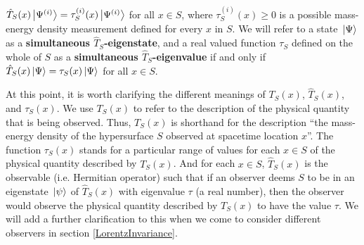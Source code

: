   $\hat{T}_S(x)\ket{\Psi^{(i)}}=\tau^{(i)}_S(x)\ket{\Psi^{(i)}}$ for all $x\in S$, where $\tau^{(i)}_S(x)\geq 0$ is a possible mass-energy density measurement defined for every $x$ in $S$. We will refer to a state $\ket*{\Psi}$ as a \textbf{simultaneous $\hat{T}_S$-eigenstate}, and a real valued function $\tau_S$ defined on the whole of $S$ as a  \textbf{simultaneous $\hat{T}_S$-eigenvalue} if and only if $\hat{T}_S(x)\ket*{\Psi}=\tau_S(x)\ket*{\Psi}$ for all $x\in S$.\label{simultaneous}

 At this point, it is worth clarifying the different meanings of $T_S(x)$, $\hat{T}_S(x)$, and $\tau_S(x)$.\label{TSclarification} We use $T_S(x)$ to refer to the description of the physical quantity that is being observed. Thus, $T_S(x)$ is shorthand for the description ``the mass-energy density of the hypersurface $S$ observed at spacetime location $x$''. The function $\tau_S(x)$ stands for a particular range of values for each $x\in S$ of the physical quantity described by $T_S(x)$. And for each $x\in S$, $\hat{T}_S(x)$ is the observable (i.e. Hermitian operator) such that if an observer deems $S$ to be in an eigenstate $\ket*{\psi}$ of  $\hat{T}_S(x)$ with eigenvalue $\tau$ (a real number), then the observer would observe the physical quantity described by  $T_S(x)$ to have the value $\tau$. We will add a further clarification to this when we come to consider different observers in section \ref{LorentzInvariance}.

